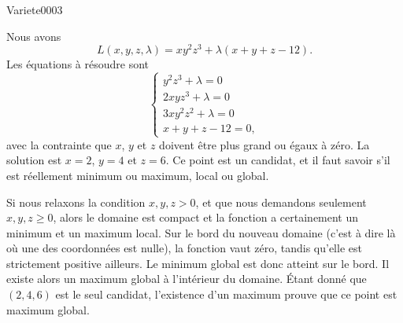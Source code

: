 
\begin{corrige}{Variete0003}

	Nous avons
	\begin{equation}
		L(x,y,z,\lambda)=xy^2z^3+\lambda(x+y+z-12).
	\end{equation}
	Les équations à résoudre sont
	\begin{equation}
		\left\{
		\begin{array}{ll}
			y^2z^3+\lambda=0\\
			2xyz^3+\lambda=0\\
			3xy^2z^2+\lambda=0\\
			x+y+z-12=0,
		\end{array}
		\right.
	\end{equation}
	avec la contrainte que $x$, $y$ et $z$ doivent être plus grand ou égaux à zéro. La
    solution est $x=2$, $y=4$ et $z=6$. Ce point est un candidat, et il faut savoir s'il est réellement minimum ou maximum, local ou global.

	Si nous relaxons la condition $x,y,z>0$, et que nous demandons seulement $x,y,z\geq 0$, alors le domaine est compact et la fonction a certainement un minimum et un maximum local. Sur le bord du nouveau domaine (c'est à dire là où une des coordonnées est nulle), la fonction vaut zéro, tandis qu'elle est strictement positive ailleurs. Le minimum global est donc atteint sur le bord. Il existe alors un maximum global à l'intérieur du domaine. Étant donné que $(2,4,6)$ est le seul candidat, l'existence d'un maximum prouve que ce point est maximum global.

\end{corrige}

